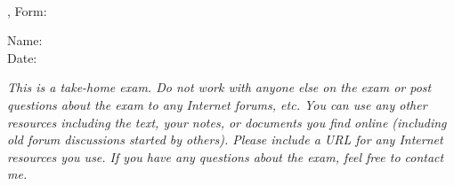 \documentclass[12pt]{examdesign}
\begin{document}
%
\begin{examtop}
  \parbox{3in}{\classdata \\
               \examtype, Form: }
  \hfill
  \parbox{3in}{\normalsize Name: \hrulefill \\[2.0ex]
                           Date: \hrulefill }
  \bigskip
\end{examtop}

\textit{This is a take-home exam. Do not work with anyone else on the exam or post questions
  about the exam to any Internet forums, etc. You can use any other resources including the
  text, your notes, or documents you find online (including old forum discussions started by
  others). Please include a URL for any Internet resources you use. If you have any questions
  about the exam, feel free to contact me.}
\end{document}
